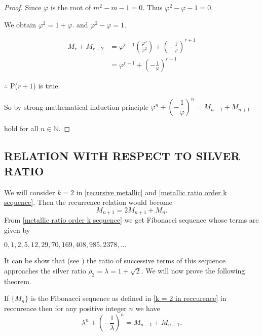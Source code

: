 \documentclass{rmutt-seminar}
\begin{document}
\begin{proof}
\quad \quad \quad Since $\varphi$ is the root of $m^2 -m -1 =0$. Thus $\varphi^2-\varphi-1=0$.
 
\quad \quad \quad  We obtain $\varphi^2=1+\varphi$. and $\varphi^2-\varphi=1$.
 
 \begin{align*}
 M_{r} + M_{r+2} &= \varphi^{r+1}\left(\frac{\varphi^2}{\varphi^2}\right)+\left(-\frac{1}{\varphi}\right)^{r+1}\\
 &= \varphi^{r+1}+\left(-\frac{1}{\varphi}\right)^{r+1}
 \end{align*}	
 
 \quad \quad \quad $\therefore$ P($r+1$) is true.
 
 \quad \quad \quad So by strong mathematical induction principle $\varphi^n + \left(-\dfrac{1}{\varphi}\right)^n = M_{n-1} + M_{n+1} $ 
 
 \quad \quad \quad hold for all $n \in \mathbb{N}$.
\end{proof}

\begin{center}
\subsection*{RELATION WITH RESPECT TO SILVER RATIO}
\end{center}

We will consider $ k = 2 $ in \eqref{recursive metallic} and \eqref{metallic ratio order k sequence}. Then the recurrence relation would become 
\begin{equation}\label{k = 2 in reccurence}
	 M_{n+1} = 2M_{n+1} + M_n.
\end{equation}  
From \eqref{metallic ratio order k sequence} we get Fibonacci sequence whose terms are given by 
\begin{center}
	$0,1,2,5,12,29,70,169,408,985,2378,\ldots $ 
\end{center}

It can be show that (see \cite{R20}) the ratio of successive terms of this sequence approaches the silver ratio
$ \rho_{2} = \lambda = 1 + \sqrt{2} $. We will now prove the following theorem.
\begin{theorem}\label{silver ratio theorem}
\textnormal{If} $\bigl\{ M_n \bigr\}$ \textnormal{is the Fibonacci sequence as defined in \eqref{k = 2 in reccurence} in reccurence then for any positive integer} $ n $ \textnormal{we have} 
\begin{equation}\label{silver ratio recursive}
	 \lambda^n + \left(-\frac{1}{\lambda}\right)^n = M_{n-1} + M_{n+1}.  
\end{equation}
\end{theorem}
\end{document}
